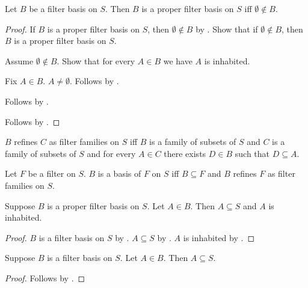 \begin{theorem}\label{proper_filter_basis_iff_emptyset_notin}
    Let $B$ be a filter basis on $S$.
    Then $B$ is a proper filter basis on $S$ iff $\emptyset\notin B$.
\end{theorem}
\begin{proof}
    If $B$ is a proper filter basis on $S$, then $\emptyset\notin B$
        by .
    Show that if $\emptyset\notin B$, then
        $B$ is a proper filter basis on $S$.
    \begin{subproof}
        Assume $\emptyset\notin B$.
        Show that for every $A\in B$ we have $A$ is inhabited.
        \begin{subproof}
            Fix $A\in B$.
            $A\neq\emptyset$.
            Follows by .
        \end{subproof}
        Follows by .
    \end{subproof}
    Follows by \auto.
\end{proof}

\begin{definition}\label{filter_family_refinement}
    $B$ refines $C$ as filter families on $S$ iff
        $B$ is a family of subsets of $S$ and
        $C$ is a family of subsets of $S$ and
        for every $A\in C$ there exists $D\in B$ such that $D\subseteq A$.
\end{definition}

\begin{definition}\label{filter_basis_of}
    Let $F$ be a filter on $S$.
    $B$ is a basis of $F$ on $S$ iff
        $B\subseteq F$ and
        $B$ refines $F$ as filter families on $S$.
\end{definition}

\begin{proposition}\label{proper_filter_basis_member_properties}
    Suppose $B$ is a proper filter basis on $S$.
    Let $A\in B$.
    Then $A\subseteq S$ and $A$ is inhabited.
\end{proposition}
\begin{proof}
    $B$ is a filter basis on $S$ by
        .
    $A\subseteq S$ by .
    $A$ is inhabited by .
\end{proof}

\begin{proposition}\label{filter_basis_member_subseteq}
    Suppose $B$ is a filter basis on $S$.
    Let $A\in B$.
    Then $A\subseteq S$.
\end{proposition}
\begin{proof}
    Follows by .
\end{proof}

